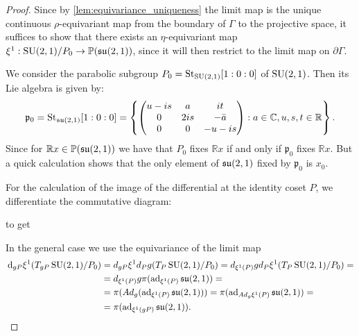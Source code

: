 \documentclass{report}
\begin{document}
\begin{proof}
Since by \cref{lem:equivariance_uniqueness} the limit map is the unique continuous $\rho$-equivariant map from the boundary of $\Gamma$ to the projective space, it suffices to show that there exists an $\eta$-equivariant map $\xi^1:\operatorname{{\mathrm{SU}}}(2,1)/P_0 \to \mathbb P(\mathfrak{su}(2,1))$, since it will then restrict to the limit map on $\partial \Gamma$.

We consider the parabolic subgroup $P_0 = \mathrm{St}_{\operatorname{{\mathrm{SU}}}(2,1)} [1:0:0]$ of $\operatorname{{\mathrm{SU}}}(2,1)$.
Then its Lie algebra is given by:
\[
\mathfrak p_0 = \mathrm{St}_{\operatorname{{\mathfrak{su}}}(2,1)}[1:0:0] = \left\{ \begin{pmatrix} u - is & a & i t \\ 0 & 2is & - \bar a \\ 0 & 0 & -u - is \end{pmatrix} : a \in \mathbb C, u,s,t \in \mathbb R \right\}.
\]
Since for $\mathbb R x \in \mathbb P(\operatorname{{\mathfrak{su}}}(2,1))$ we have that $P_0$ fixes $\mathbb R x$ if and only if $\mathfrak p_0$ fixes $\mathbb R x$.
But a quick calculation shows that the only element of $\operatorname{{\mathfrak{su}}}(2,1)$ fixed by $\mathfrak p_0$ is $x_0$.

For the calculation of the image of the differential at the identity coset $P$, we differentiate the commutative diagram:
\begin{center}
    to get
\end{center}


In the general case we use the equivariance of the limit map
\begin{align*}
    \,\mathrm{d}_{gP} \xi^1 (T_{gP} \operatorname{{\mathrm{SU}}}(2,1)/P_0) &=
    d_{gP} \xi^1 d_P g (T_P \operatorname{{\mathrm{SU}}}(2,1)/P_0) =
    d_{\xi^1(P)} g d_P \xi^1 (T_P \operatorname{{\mathrm{SU}}}(2,1)/P_0) =\\
    &= d_{\xi^1(P)} g \pi(\operatorname{ad}_{\xi^1(P)} \operatorname{{\mathfrak{su}}}(2,1)) =\\
    &= \pi(Ad_g(\operatorname{ad}_{\xi^1(P)} \operatorname{{\mathfrak{su}}}(2,1))) = \pi(\operatorname{ad}_{Ad_g \xi^1(P)} \operatorname{{\mathfrak{su}}}(2,1))=\\
    &= \pi(\operatorname{ad}_{\xi^1(gP)} \operatorname{{\mathfrak{su}}}(2,1)).
\end{align*}
\end{proof}
\end{document}

